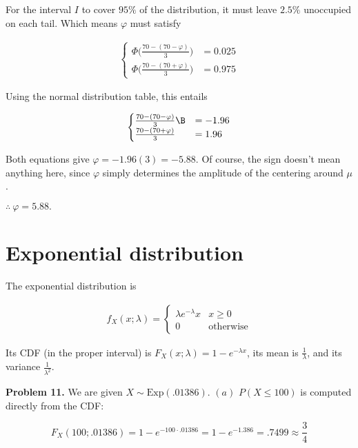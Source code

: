 \documentclass[a4paper, 12pt]{article}
\begin{document}
For the interval $I$ to cover $95\%$ of the distribution, it must 
leave $2.5\%$ unoccupied on each tail. Which means $\varphi$ must 
satisfy

\begin{align*}
    \begin{cases}
        \Phi\Big( \frac{70 - (70 - \varphi)}{3} \Big) &= 0.025 \\
        \Phi\Big(\frac{70- (70 + \varphi)}{3}\Big) &= 0.975
    \end{cases}
\end{align*}


Using the normal distribution table, this entails 

\begin{align*}
    \begin{cases}
        \frac{70 - (70 - \varphi)}{3} \B&= -1.96 \\ 
        \frac{70- (70 + \varphi)}{3}&= 1.96
    \end{cases}
\end{align*}

Both equations give $\varphi = -1.96(3) = -5.88$. Of course, the sign doesn't mean anything here,
since $\varphi$ simply determines the amplitude of the centering around $\mu$.  

$\therefore  ~ \varphi = 5.88.$

\pagebreak 

\section{Exponential distribution}

The exponential distribution is 

\begin{align*}
    f_X(x; \lambda) = \begin{cases}
        \lambda e^{-\lambda}x & x \geq 0 \\ 
        0 & \text{otherwise}
    \end{cases}
\end{align*}

Its CDF (in the proper interval) is $F_X(x; \lambda) = 1 - e^{-\lambda x}$, its mean is $\frac{1}{\lambda}$, and its variance $\frac{1}{\lambda^2}$.

\textbf{Problem 11.} We are given $X \sim \text{Exp}(.01386)$. $(a)$ $P(X \leq 100)$ is 
computed directly from the CDF: 

\begin{equation*}
    F_X(100; .01386) = 1 - e^{-100 \cdot .01386} = 1 - e^{-1.386} = .7499 \approx \frac{3}{4}
\end{equation*}
\end{document}
